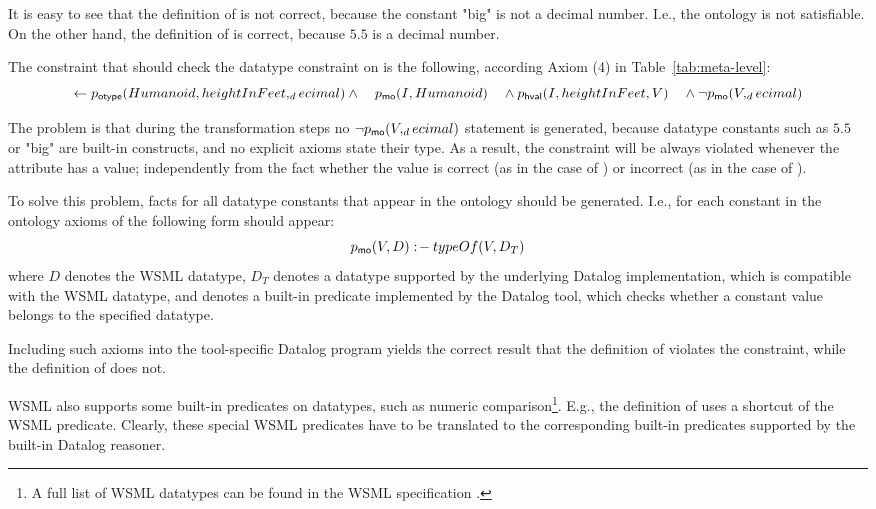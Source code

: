 It is easy to see that the definition of  is not
correct, because the constant "big" is not a decimal number. I.e.,
the ontology is not satisfiable. On the other hand, the definition
of  is correct, because $5.5$ is a decimal number.

The constraint that should check the datatype constraint on
 is the following, according Axiom (4) in
Table~\ref{tab:meta-level}:
\begin{displaymath}
    \leftarrow p_{\mathrm{\sf otype}}(Humanoid,heightInFeet,_decimal) \wedge \\
    \phantom{\leftarrow} p_{\mathrm{\sf mo}}(I,Humanoid) \\
  \phantom{\leftarrow} \wedge p_{\mathrm{\sf hval}}(I,heightInFeet,V) \\
  \phantom{\leftarrow} \wedge \neg p_{\mathrm{\sf mo}}(V,_decimal)
\end{displaymath}

The problem is that during the transformation steps no $\neg
p_{\mathrm{\sf mo}}(V,_decimal)$ statement is generated, because datatype
constants such as $5.5$ or "big" are built-in constructs, and no
explicit axioms state their type. As a result, the constraint will
be always violated whenever the  attribute has a
value; independently from the fact whether the value is correct
(as in the case of ) or incorrect (as in the case of
).

To solve this problem, \pmo facts for all datatype constants that
appear in the ontology should be generated. I.e., for each
constant in the ontology axioms of the following form should
appear:
\begin{displaymath}
    \pmo(V,D) \wsml{\lprl} \typeof(V, D_T)
\end{displaymath} where $D$ denotes the WSML datatype, $D_T$ denotes a datatype supported by the underlying Datalog implementation, which is compatible with the WSML datatype, and \typeof denotes a built-in predicate implemented by the Datalog tool, which checks whether a constant value belongs to the specified datatype.

Including such axioms into the tool-specific Datalog program
yields the correct result that the definition of 
violates the  constraint, while the definition of
 does not.

WSML also supports some built-in predicates on datatypes, such as
numeric comparison\footnote{A full list of WSML datatypes can be
found in the WSML specification \cite{wsml-spec}.}. E.g., the
definition of  uses a shortcut of the WSML
 predicate. Clearly, these special WSML
predicates have to be translated to the corresponding built-in
predicates supported by the built-in Datalog reasoner.

